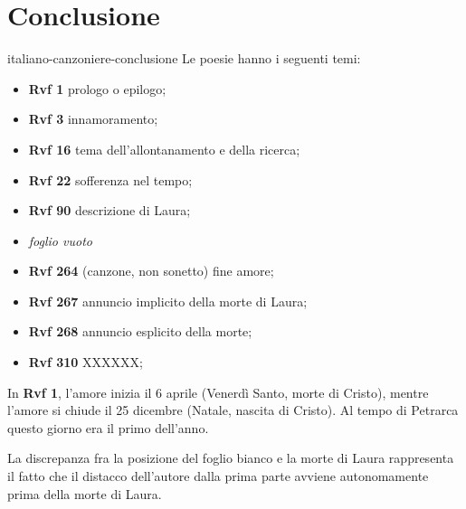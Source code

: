 \documentclass[preview]{standalone}
\begin{document}
\genpage

\section{Conclusione}

\begin{snippet}{italiano-canzoniere-conclusione}
    Le poesie hanno i seguenti temi:
    \begin{itemize}
        \item \textbf{Rvf 1} prologo o epilogo;
        \item \textbf{Rvf 3} innamoramento;
        \item \textbf{Rvf 16} tema dell'allontanamento e della ricerca;
        \item \textbf{Rvf 22} sofferenza nel tempo;
        \item \textbf{Rvf 90} descrizione di Laura;
        \item \textit{foglio vuoto}
        \item \textbf{Rvf 264} (canzone, non sonetto) fine amore;
        \item \textbf{Rvf 267} annuncio implicito della morte di Laura;
        \item \textbf{Rvf 268} annuncio esplicito della morte;
        \item \textbf{Rvf 310} XXXXXX;
    \end{itemize}
    
    In \textbf{Rvf 1}, l'amore inizia il 6 aprile (Venerdì Santo, morte di Cristo),
    mentre l'amore si chiude il 25 dicembre (Natale, nascita di Cristo).
    Al tempo di Petrarca questo giorno era il primo dell'anno. 
    
    La discrepanza fra la posizione del foglio bianco e la morte di Laura rappresenta il
    fatto che il distacco dell'autore dalla prima parte
    avviene autonomamente prima della morte di Laura.
\end{snippet}
\end{document}
